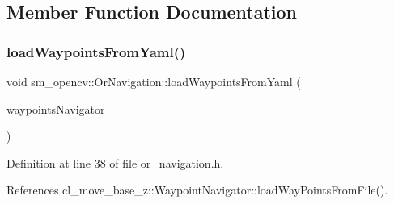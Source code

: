 \subsection{Member Function Documentation}
\mbox{\label{classsm__opencv_1_1OrNavigation_aa99364dd28b18be701d85187f9896999}} 
\subsubsection{\texorpdfstring{load\+Waypoints\+From\+Yaml()}{loadWaypointsFromYaml()}}
{\footnotesize\ttfamily void sm\+\_\+opencv\+::\+Or\+Navigation\+::load\+Waypoints\+From\+Yaml (\begin{DoxyParamCaption}\item[{\hyperlink{classcl__move__base__z_1_1WaypointNavigator}{Waypoint\+Navigator} $\ast$}]{waypoints\+Navigator }\end{DoxyParamCaption})\hspace{0.3cm}{\ttfamily [inline]}}



Definition at line 38 of file or\+\_\+navigation.\+h.



References cl\+\_\+move\+\_\+base\+\_\+z\+::\+Waypoint\+Navigator\+::load\+Way\+Points\+From\+File().


